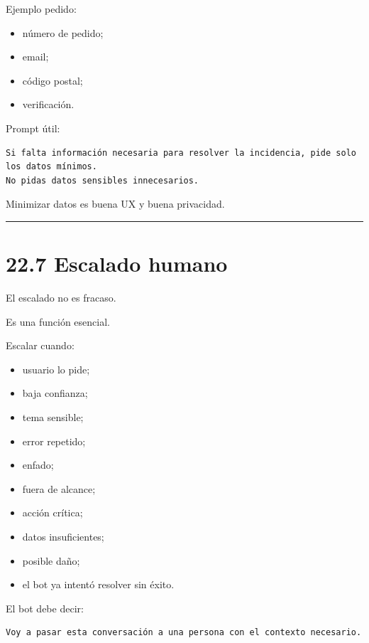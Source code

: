 Ejemplo pedido:

\begin{itemize}
\tightlist
\item
  número de pedido;
\item
  email;
\item
  código postal;
\item
  verificación.
\end{itemize}

Prompt útil:

\begin{lstlisting}
Si falta información necesaria para resolver la incidencia, pide solo los datos mínimos.
No pidas datos sensibles innecesarios.
\end{lstlisting}

Minimizar datos es buena UX y buena privacidad.

\begin{center}\rule{0.5\linewidth}{0.5pt}\end{center}

\section{22.7 Escalado humano}\label{escalado-humano}

El escalado no es fracaso.

Es una función esencial.

Escalar cuando:

\begin{itemize}
\tightlist
\item
  usuario lo pide;
\item
  baja confianza;
\item
  tema sensible;
\item
  error repetido;
\item
  enfado;
\item
  fuera de alcance;
\item
  acción crítica;
\item
  datos insuficientes;
\item
  posible daño;
\item
  el bot ya intentó resolver sin éxito.
\end{itemize}

El bot debe decir:

\begin{lstlisting}
Voy a pasar esta conversación a una persona con el contexto necesario.
\end{lstlisting}

